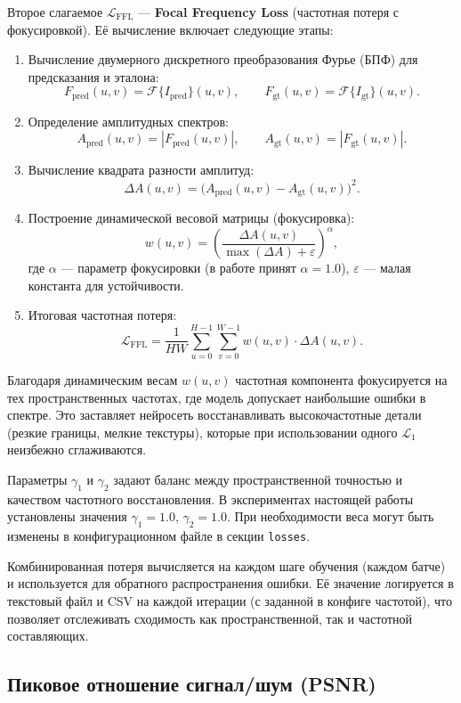\documentclass[12pt,a4paper]{article}
\begin{document}
Второе слагаемое \(\mathcal{L}_{\text{FFL}}\) — \textbf{Focal Frequency Loss} (частотная потеря с фокусировкой). Её вычисление включает следующие этапы:
\begin{enumerate}
    \item Вычисление двумерного дискретного преобразования Фурье (БПФ) для предсказания и эталона:
    \[
    F_{\text{pred}}(u,v) = \mathcal{F}\{I_{\text{pred}}\}(u,v), \qquad 
    F_{\text{gt}}(u,v) = \mathcal{F}\{I_{\text{gt}}\}(u,v).
    \]
    \item Определение амплитудных спектров:
    \[
    A_{\text{pred}}(u,v) = |F_{\text{pred}}(u,v)|, \qquad
    A_{\text{gt}}(u,v) = |F_{\text{gt}}(u,v)|.
    \]
    \item Вычисление квадрата разности амплитуд:
    \[
    \Delta A(u,v) = \bigl(A_{\text{pred}}(u,v) - A_{\text{gt}}(u,v)\bigr)^2.
    \]
    \item Построение динамической весовой матрицы (фокусировка):
    \[
    w(u,v) = \left(\frac{\Delta A(u,v)}{\max(\Delta A) + \varepsilon}\right)^{\alpha},
    \]
    где \(\alpha\) — параметр фокусировки (в работе принят \(\alpha = 1.0\)), \(\varepsilon\) — малая константа для устойчивости.
    \item Итоговая частотная потеря:
    \[
    \mathcal{L}_{\text{FFL}} = \frac{1}{H W}\sum_{u=0}^{H-1}\sum_{v=0}^{W-1} w(u,v) \cdot \Delta A(u,v).
    \]
\end{enumerate}
Благодаря динамическим весам \(w(u,v)\) частотная компонента фокусируется на тех пространственных частотах, где модель допускает наибольшие ошибки в спектре. Это заставляет нейросеть восстанавливать высокочастотные детали (резкие границы, мелкие текстуры), которые при использовании одного \(\mathcal{L}_1\) неизбежно сглаживаются.

Параметры \(\gamma_1\) и \(\gamma_2\) задают баланс между пространственной точностью и качеством частотного восстановления. В экспериментах настоящей работы установлены значения \(\gamma_1 = 1.0\), \(\gamma_2 = 1.0\). При необходимости веса могут быть изменены в конфигурационном файле в секции \texttt{losses}. 

Комбинированная потеря вычисляется на каждом шаге обучения (каждом батче) и используется для обратного распространения ошибки. Её значение логируется в текстовый файл и CSV на каждой итерации (с заданной в конфиге частотой), что позволяет отслеживать сходимость как пространственной, так и частотной составляющих.

\subsection{Пиковое отношение сигнал/шум (PSNR)}
\end{document}
